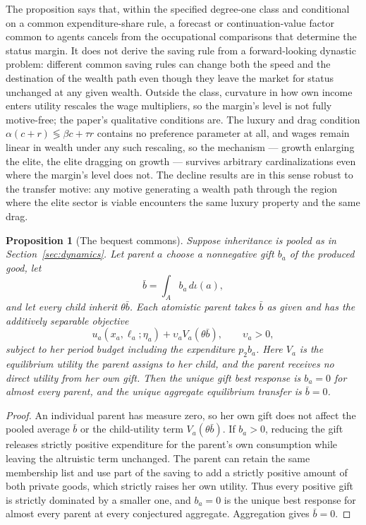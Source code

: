 \documentclass[12pt,letterpaper]{article}
\newtheorem{proposition}{Proposition}
\theoremstyle{definition}
\begin{document}
The proposition says that, within the specified degree-one class and conditional on a common expenditure-share rule, a forecast or continuation-value factor common to agents cancels from the occupational comparisons that determine the status margin.
It does not derive the saving rule from a forward-looking dynastic problem: different common saving rules can change both the speed and the destination of the wealth path even though they leave the market for status unchanged at any given wealth.
Outside the class, curvature in how own income enters utility rescales the wage multipliers, so the margin's level is not fully motive-free; the paper's qualitative conditions are.
The luxury and drag condition $\alpha(c+r)\lessgtr\beta c+\tau r$ contains no preference parameter at all, and wages remain linear in wealth under any such rescaling, so the mechanism --- growth enlarging the elite, the elite dragging on growth --- survives arbitrary cardinalizations even where the margin's level does not.
The decline results are in this sense robust to the transfer motive: any motive generating a wealth path through the region where the elite sector is viable encounters the same luxury property and the same drag.

\begin{proposition}[The bequest commons]\label{prop:commons}
Suppose inheritance is pooled as in Section~\ref{sec:dynamics}.
Let parent $a$ choose a nonnegative gift $b_a$ of the produced good, let
\[
  \bar b=\int_A b_a\,d\iota(a),
\]
and let every child inherit $\theta\bar b$.
Each atomistic parent takes $\bar b$ as given and has the additively separable objective
\[
  u_a(x_a,\ell_a;\eta_a)
  +
  \upsilon_a V_a(\theta\bar b),
  \qquad
  \upsilon_a>0,
\]
subject to her period budget including the expenditure $p_2b_a$.
Here $V_a$ is the equilibrium utility the parent assigns to her child, and the parent receives no direct utility from her own gift.
Then the unique gift best response is $b_a=0$ for almost every parent, and the unique aggregate equilibrium transfer is $\bar b=0$.
\end{proposition}

\begin{proof}
An individual parent has measure zero, so her own gift does not affect the pooled average $\bar b$ or the child-utility term $V_a(\theta\bar b)$.
If $b_a>0$, reducing the gift releases strictly positive expenditure for the parent's own consumption while leaving the altruistic term unchanged.
The parent can retain the same membership list and use part of the saving to add a strictly positive amount of both private goods, which strictly raises her own utility.
Thus every positive gift is strictly dominated by a smaller one, and $b_a=0$ is the unique best response for almost every parent at every conjectured aggregate.
Aggregation gives $\bar b=0$.
\end{proof}
\end{document}

